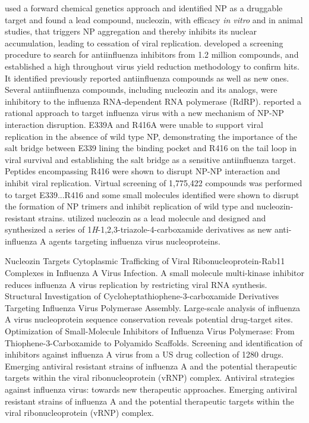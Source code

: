 \citep{906} used a forward chemical genetics approach and identified NP as a druggable target and found a lead compound, nucleozin, with efficacy \textit{in vitro} and in animal studies, that triggers NP aggregation and thereby inhibits its nuclear accumulation, leading to cessation of viral replication. \citep{1515} developed a screening procedure to search for antiinfluenza inhibitors from 1.2 million compounds, and established a high throughout virus yield reduction methodology to confirm hits. It identified previously reported antiinfluenza compounds as well as new ones. Several antiinfluenza compounds, including nucleozin and its analogs, were inhibitory to the influenza RNA-dependent RNA polymerase (RdRP). \citep{1233} reported a rational approach to target influenza virus with a new mechanism of NP-NP interaction disruption. E339A and R416A were unable to support viral replication in the absence of wild type NP, demonstrating the importance of the salt bridge between E339 lining the binding pocket and R416 on the tail loop in viral survival and establishing the salt bridge as a sensitive antiinfluenza target. Peptides encompassing R416 were shown to disrupt NP-NP interaction and inhibit viral replication. Virtual screening of 1,775,422 compounds was performed to target E339...R416 and some small molecules identified were shown to disrupt the formation of NP trimers and inhibit replication of wild type and nucleozin-resistant strains. \citep{1516} utilized nucleozin as a lead molecule and designed and synthesized a series of 1\textit{H}-1,2,3-triazole-4-carboxamide derivatives as new anti-influenza A agents targeting influenza virus nucleoproteins.

\citep{1521} Nucleozin Targets Cytoplasmic Trafficking of Viral Ribonucleoprotein-Rab11 Complexes in Influenza A Virus Infection.%
\citep{1524} A small molecule multi-kinase inhibitor reduces influenza A virus replication by restricting viral RNA synthesis.%
\citep{1550} Structural Investigation of Cycloheptathiophene-3-carboxamide Derivatives Targeting Influenza Virus Polymerase Assembly.%
\citep{1513} Large-scale analysis of influenza A virus nucleoprotein sequence conservation reveals potential drug-target sites.%
\citep{1527} Optimization of Small-Molecule Inhibitors of Influenza Virus Polymerase: From Thiophene-3-Carboxamide to Polyamido Scaffolds.%
\citep{1526} Screening and identification of inhibitors against influenza A virus from a US drug collection of 1280 drugs.%
\citep{1523} Emerging antiviral resistant strains of influenza A and the potential therapeutic targets within the viral ribonucleoprotein (vRNP) complex.%
\citep{1525} Antiviral strategies against influenza virus: towards new therapeutic approaches.%
\citep{1549} Emerging antiviral resistant strains of influenza A and the potential therapeutic targets within the viral ribonucleoprotein (vRNP) complex.

